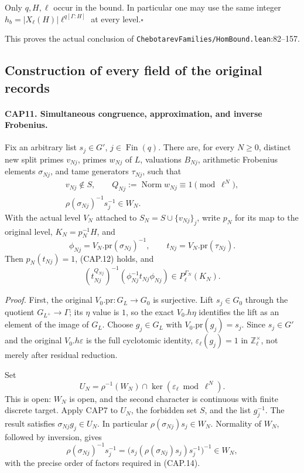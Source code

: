 Only $q,H,\ell$ occur in the bound.  In particular one may use the
same integer
$h_b=|X_\ell(H)|\ell^{q[\Gamma:H]}$ at every level.\hfill$\square$

This proves the actual conclusion of
\nolinkurl{ChebotarevFamilies/HomBound.lean}:82--157.

\subsection{Construction of every field of the original records}

\paragraph{CAP11. Simultaneous congruence, approximation, and inverse Frobenius.}
\label{claim:CAP11}
Fix an arbitrary list $s_j\in G'$, $j\in\operatorname{Fin}(q)$.
There are, for every $N\geq0$, distinct new split primes $v_{Nj}$,
primes $w_{Nj}$ of $L$, valuations $B_{Nj}$, arithmetic Frobenius
elements $\sigma_{Nj}$, and tame generators $\tau_{Nj}$, such that
\[
 \begin{gathered}
 v_{Nj}\notin S,\qquad
 Q_{Nj}:=\operatorname{Norm}w_{Nj}\equiv1\pmod{\ell^N},\\
 \rho(\sigma_{Nj})^{-1}s_j^{-1}\in W_N.
 \end{gathered}
 \tag{CAP.14}
\]
With the actual level $V_N$ attached to
$S_N=S\cup\{v_{Nj}\}_j$, write $p_N$ for its map to the original
level, $K_N=p_N^{-1}H$, and
\[
 \phi_{Nj}=V_N.\mathrm{pr}(\sigma_{Nj})^{-1},\qquad
 t_{Nj}=V_N.\mathrm{pr}(\tau_{Nj}).
 \tag{CAP.15}
\]
Then $p_N(t_{Nj})=1$, (CAP.12) holds, and
\[
 (t_{Nj}^{Q_{Nj}})^{-1}
    (\phi_{Nj}^{-1}t_{Nj}\phi_{Nj})
       \in P_\ell^{\Gamma_N}(K_N).
 \tag{CAP.16}
\]

\emph{Proof.}
First, the original $V_0.\mathrm{pr}:G_L\to G_0$ is surjective.
Lift $s_j\in G_0$ through the quotient $G_{L^+}\to\Gamma$; its
$\eta$ value is $1$, so the exact $V_0.h\eta$ identifies the lift
as an element of the image of $G_L$.  Choose $g_j\in G_L$ with
$V_0.\mathrm{pr}(g_j)=s_j$.  Since $s_j\in G'$ and the original
$V_0.h\varepsilon$ is the full cyclotomic identity,
$\varepsilon_\ell(g_j)=1$ in $\mathbb Z_\ell^\times$, not merely
after residual reduction.

Set
\[
 U_N=\rho^{-1}(W_N)\cap\ker(\varepsilon_\ell\bmod\ell^N).
 \tag{CAP.17}
\]
This is open: $W_N$ is open, and the second character is continuous
with finite discrete target.  Apply CAP7 to $U_N$, the forbidden
set $S$, and the list $g_j^{-1}$.  The result satisfies
$\sigma_{Nj}g_j\in U_N$.  In particular
$\rho(\sigma_{Nj})s_j\in W_N$.  Normality of $W_N$, followed by
inversion, gives
\[
 \rho(\sigma_{Nj})^{-1}s_j^{-1}
  =\bigl(s_j(\rho(\sigma_{Nj})s_j)s_j^{-1}\bigr)^{-1}\in W_N,
\]
with the precise order of factors required in (CAP.14).

